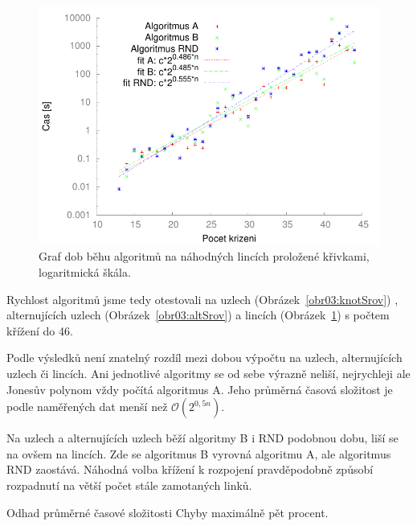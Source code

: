 \begin{figure}[p]\centering
\includegraphics{../img/linksFIT}
\caption{Graf dob běhu algoritmů na náhodných lincích proložené křivkami, logaritmická škála.}
\label{obr03:linkSrov}
\end{figure}

Rychlost algoritmů jsme tedy otestovali na uzlech (Obrázek~\ref{obr03:knotSrov}) , alternujících uzlech (Obrázek~\ref{obr03:altSrov}) a lincích (Obrázek~\ref{obr03:linkSrov}) s počtem křížení do 46. 

Podle výsledků není znatelný rozdíl mezi dobou výpočtu na uzlech, alternujících uzlech či lincích. Ani jednotlivé algoritmy se od sebe výrazně neliší, nejrychleji ale Jonesův polynom vždy počítá algoritmus A. Jeho průměrná časová složitost je podle naměřených dat menší než $\mathcal{O}(2^{0,5n})$. 

Na uzlech a alternujících uzlech běží algoritmy B i RND podobnou dobu, liší se na ovšem na lincích. Zde se algoritmus B vyrovná algoritmu A, ale algoritmus RND zaostává. Náhodná volba křížení k rozpojení pravděpodobně způsobí rozpadnutí na větší počet stále zamotaných linků.

Odhad průměrné časové složitosti
Chyby maximálně pět procent.

